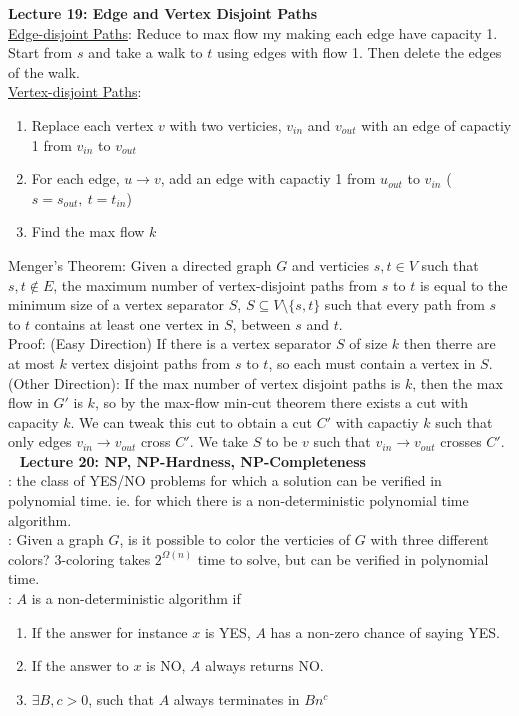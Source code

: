 \documentclass{article}
\begin{document}
\textbf{Lecture 19: Edge and Vertex Disjoint Paths} \\[1.0ex]
\underline{Edge-disjoint Paths}: Reduce to max flow my making each edge have capacity 1. Start from $s$ and take a walk to $t$ using edges with flow 1. Then delete the edges of the walk. \\[0.5ex]
\underline{Vertex-disjoint Paths}:
\begin{enumerate}
    \item Replace each vertex $v$ with two verticies, $v_{in}$ and $v_{out}$ with an edge of capactiy 1 from $v_{in}$ to $v_{out}$
    \item For each edge, $u \rightarrow v$, add an edge with capactiy 1 from $u_{out}$ to $v_{in}$ ($s = s_{out},\ t = t_{in}$)
    \item Find the max flow $k$
\end{enumerate}
Menger's Theorem: Given a directed graph $G$ and verticies $s, t \in V$ such that $s, t \notin E$, the maximum number of vertex-disjoint paths from $s$ to $t$ is equal to the minimum size of a vertex separator $S$, $S \subseteq V \setminus \{s, t\}$ such that every path from $s$ to $t$ contains at least one vertex in $S$, between $s$ and $t$. \\[0.5ex]
Proof: (Easy Direction) If there is a vertex separator $S$ of size $k$ then therre are at most $k$ vertex disjoint paths from $s$ to $t$, so each must contain a vertex in $S$. (Other Direction): If the max number of vertex disjoint paths is $k$, then the max flow in $G'$ is $k$, so by the max-flow min-cut theorem there exists a cut with capacity $k$. We can tweak this cut to obtain a cut $C'$ with capactiy $k$ such that only edges $v_{in} \rightarrow v_{out}$ cross $C'$. We take $S$ to be $v$ such that $v_{in} \rightarrow v_{out}$ crosses $C'$. \
\newpage
\textbf{Lecture 20: NP, NP-Hardness, NP-Completeness} \\[1.0ex]
: the class of YES/NO problems for which a solution can be verified in polynomial time. ie. for which there is a non-deterministic polynomial time algorithm. \\
\underbar{Ex. 3 coloring problem}: Given a graph $G$, is it possible to color the verticies of $G$ with three different colors? 3-coloring takes $2^{\Omega(n)}$ time to solve, but can be verified in polynomial time. \\ 
\underbar{Non-Deterministic}: $A$ is a non-deterministic algorithm if \begin{enumerate}
    \item If the answer for instance $x$ is YES, $A$ has a non-zero chance of saying YES. 
    \item If the answer to $x$ is NO, $A$ always returns NO.
    \item $\exists B, c > 0$, such that $A$ always terminates in $Bn^c$
\end{enumerate}
\end{document}
